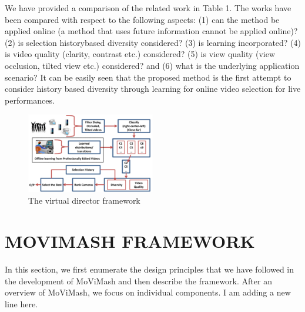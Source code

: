 \documentclass{new}
\begin{document}
We have provided a comparison of the related work in  Table 1.
The works have been compared with respect to the following aspects:
(1) can the method be applied online (a method that uses future
information cannot be applied online)? (2) is selection historybased
diversity considered? (3) is learning incorporated? (4) is
video quality (clarity, contrast etc.) considered? (5) is view quality
(view occlusion, tilted view etc.) considered? and (6) what is the
underlying application scenario? It can be easily seen that the proposed
method is the first attempt to consider history based diversity
through learning for online video selection for live performances.
\begin{figure}[h]
\includegraphics[width=0.5\textwidth]{img2}
\caption{The virtual director framework}
\end{figure}
\section{MOVIMASH FRAMEWORK}
In this section, we first enumerate the design principles that we
have followed in the development of MoViMash and then describe
the framework. After an overview of MoViMash, we focus on individual
components.
I am adding a new line here.
\end{document}
